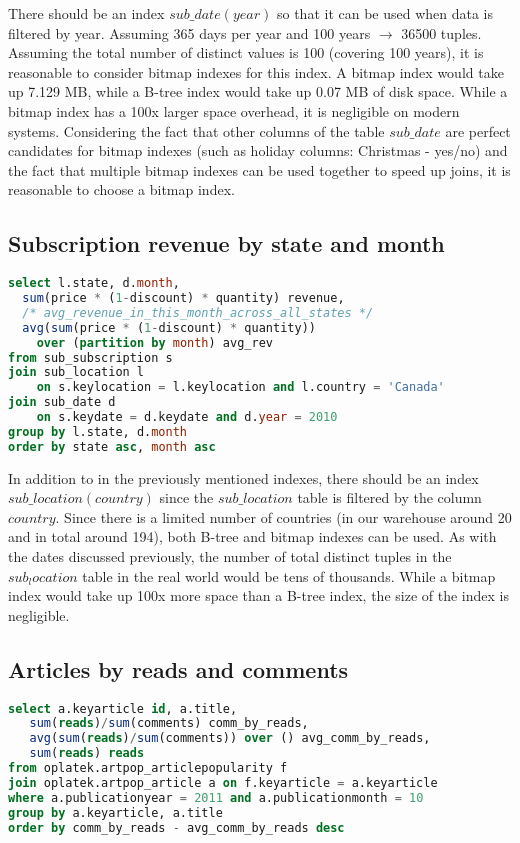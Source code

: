 There should be an index $sub\_date(year)$ so that it can be used when data is filtered by year. Assuming 365 days per year and 100 years $\rightarrow$ 36500 tuples. Assuming the total number of distinct values is 100 (covering 100 years), it is reasonable to consider bitmap indexes for this index. A bitmap index would take up 7.129 MB, while a B-tree index would take up 0.07 MB of disk space. While a bitmap index has a 100x larger space overhead, it is negligible on modern systems. Considering the fact that other columns of the table $sub\_date$ are perfect candidates for bitmap indexes (such as holiday columns: Christmas - yes/no) and the fact that multiple bitmap indexes can be used together to speed up joins, it is reasonable to choose a bitmap index.

\subsection*{Subscription revenue by state and month} 
\begin{lstlisting}[language=sql] 
select l.state, d.month, 
  sum(price * (1-discount) * quantity) revenue,
  /* avg_revenue_in_this_month_across_all_states */
  avg(sum(price * (1-discount) * quantity)) 
    over (partition by month) avg_rev 
from sub_subscription s 
join sub_location l 
    on s.keylocation = l.keylocation and l.country = 'Canada' 
join sub_date d 
    on s.keydate = d.keydate and d.year = 2010
group by l.state, d.month
order by state asc, month asc
\end{lstlisting}

In addition to in the previously mentioned indexes, there should be an index $sub\_location(country)$ since the $sub\_location$ table is filtered by the column $country$. Since there is a limited number of countries (in our warehouse around 20 and in total around 194), both B-tree and bitmap indexes can be used. As with the dates discussed previously, the number of total distinct tuples in the $sub_location$ table in the real world would be tens of thousands. While a bitmap index would take up 100x more space than a B-tree index, the size of the index is negligible.

\subsection*{Articles by reads and comments} 
\begin{lstlisting}[language=sql] 
select a.keyarticle id, a.title,
   sum(reads)/sum(comments) comm_by_reads,
   avg(sum(reads)/sum(comments)) over () avg_comm_by_reads,
   sum(reads) reads
from oplatek.artpop_articlepopularity f
join oplatek.artpop_article a on f.keyarticle = a.keyarticle
where a.publicationyear = 2011 and a.publicationmonth = 10
group by a.keyarticle, a.title
order by comm_by_reads - avg_comm_by_reads desc
\end{lstlisting}

